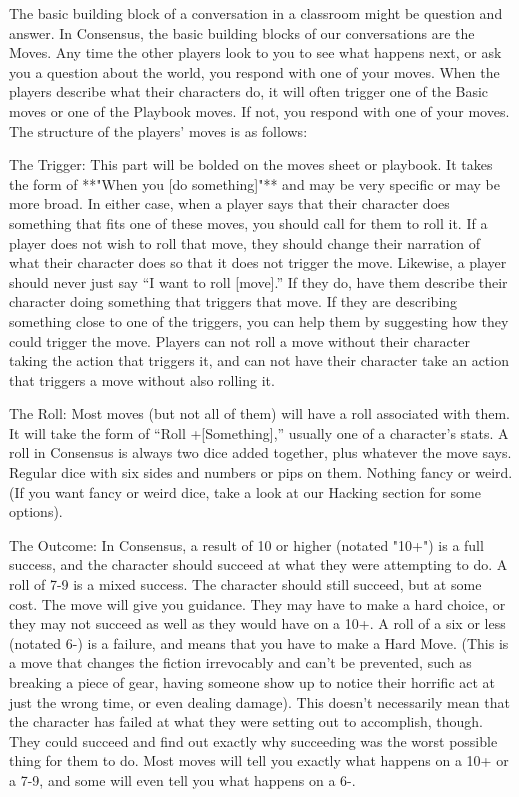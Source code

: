 \documentclass[
  oneside,
  statementpaper,
  9pt]{memoir}
\begin{document}
\begin{MC}

The basic building block of a conversation in a classroom might be question and answer. In Consensus, the basic building blocks of our conversations are the Moves. Any time the other players look to you to see what happens next, or ask you a question about the world, you respond with one of your moves. When the players describe what their characters do, it will often trigger one of the Basic moves or one of the Playbook moves. If not, you respond with one of your moves. The structure of the players' moves is as follows:

The Trigger: This part will be bolded on the moves sheet or playbook. It takes the form of **"When you [do something]"** and may be very specific or may be more broad. In either case, when a player says that their character does something that fits one of these moves, you should call for them to roll it. If a player does not wish to roll that move, they should change their narration of what their character does so that it does not trigger the move. Likewise, a player should never just say “I want to roll [move].” If they do, have them describe their character doing something that triggers that move. If they are describing something close to one of the triggers, you can help them by suggesting how they could trigger the move. Players can not roll a move without their character taking the action that triggers it, and can not have their character take an action that triggers a move without also rolling it.

The Roll: Most moves (but not all of them) will have a roll associated with them. It will take the form of “Roll +[Something],” usually one of a character’s stats. A roll in Consensus is always two dice added together, plus whatever the move says. Regular dice with six sides and numbers or pips on them. Nothing fancy or weird. (If you want fancy or weird dice, take a look at our Hacking section for some options). 

The Outcome: In Consensus, a result of 10 or higher (notated "10+") is a full success, and the character should succeed at what they were attempting to do. A roll of 7-9 is a mixed success. The character should still succeed, but at some cost. The move will give you guidance. They may have to make a hard choice, or they may not succeed as well as they would have on a 10+. A roll of a six or less (notated 6-) is a failure, and means that you have to make a Hard Move. (This is a move that changes the fiction irrevocably and can’t be prevented, such as breaking a piece of gear, having someone show up to notice their horrific act at just the wrong time, or even dealing damage). This doesn’t necessarily mean that the character has failed at what they were setting out to accomplish, though. They could succeed and find out exactly why succeeding was the worst possible thing for them to do. Most moves will tell you exactly what happens on a 10+ or a 7-9, and some will even tell you what happens on a 6-.

\end{MC}
\end{document}
